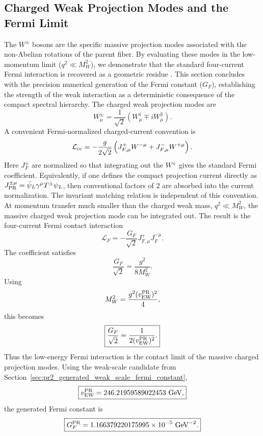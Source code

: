 \documentclass[11pt]{article}
\begin{document}
\subsection{Charged Weak Projection Modes and the Fermi Limit}
\label{sec:pr2_charged_weak_projection_fermi_limit}
 The $W^\pm$ bosons are the specific massive projection modes associated with the non-Abelian rotations of the parent fiber. By evaluating these modes in the low-momentum limit ($q^2 \ll M_W^2$), we demonstrate that the standard four-current Fermi interaction is recovered as a geometric residue \cite{Fermi1934}. This section concludes with the precision numerical generation of the Fermi constant ($G_F$), establishing the strength of the weak interaction as a deterministic consequence of the compact spectral hierarchy. The charged weak projection modes are
\begin{equation}
W_\mu^\pm
=
\frac{1}{\sqrt2}
\left(
W_\mu^1
\mp iW_\mu^2
\right).
\end{equation}
A convenient Fermi-normalized charged-current convention is
\begin{equation}
\mathcal L_{\rm cc}
=
-\frac{g}{2\sqrt2}
\left(
J_{F,\mu}^+W^{-\mu}
+
J_{F,\mu}^-W^{+\mu}
\right).
\end{equation}
Here \(J_F^\pm\) are normalized so that integrating out the \(W^\pm\) gives the standard Fermi coefficient. 
Equivalently, if one defines the compact projection current directly as $J_{\rm PR}^{\pm\mu}=\bar\psi_L\gamma^\mu T^\pm\psi_L$, then conventional factors of \(2\) are absorbed into the current normalization. The invariant matching relation is independent of this convention. At momentum transfer much smaller than the charged weak mass, $q^2\ll M_W^2$, the massive charged weak projection mode can be integrated out. 
The result is the four-current Fermi contact interaction
\begin{equation}
\boxed{
\mathcal L_F
=
-\frac{G_F}{\sqrt2}
J_{F,\mu}^+J_F^{-\mu}.
}
\end{equation}
The coefficient satisfies
\begin{equation}
\frac{G_F}{\sqrt2}
=
\frac{g^2}{8M_W^2}.
\end{equation}
Using
\begin{equation}
M_W^2
=
\frac{g^2(v_{\rm EW}^{\rm PR})^2}{4},
\end{equation}
this becomes
\begin{equation}
\boxed{
\frac{G_F}{\sqrt2}
=
\frac{1}{2(v_{\rm EW}^{\rm PR})^2}.
}
\end{equation}
Thus the low-energy Fermi interaction is the contact limit of the massive charged projection modes. Using the weak-scale candidate from Section~\ref{sec:pr2_generated_weak_scale_fermi_constant},
\begin{equation}
\boxed{
v_{\rm EW}^{\rm PR}
=
246.21959589022453\ {\rm GeV},
}
\end{equation}
the generated Fermi constant is
\begin{equation}
\boxed{
G_F^{\rm PR}
=
1.166379220175995\times10^{-5}\ {\rm GeV}^{-2}.
}
\end{equation}
\end{document}
